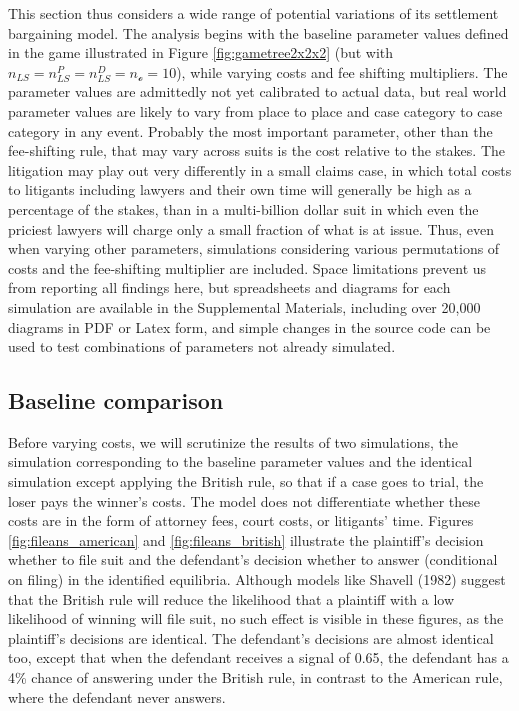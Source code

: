 \documentclass{article}
\begin{document}
This section thus considers a wide range of potential variations of its settlement bargaining model. The analysis begins with the baseline parameter values defined in the game illustrated in Figure \ref{fig:gametree2x2x2} (but with $n_{LS}=n_{LS}^P=n_{LS}^D=n_{\mathcal{o}}=10$), while varying costs and fee shifting multipliers. The parameter values are admittedly not yet calibrated to actual data, but real world parameter values are likely to vary from place to place and case category to case category in any event. Probably the most important parameter, other than the fee-shifting rule, that may vary across suits is the cost relative to the stakes. The litigation may play out very differently in a small claims case, in which total costs to litigants including lawyers and their own time will generally be high as a percentage of the stakes, than in a multi-billion dollar suit in which even the priciest lawyers will charge only a small fraction of what is at issue. Thus, even when varying other parameters, simulations considering various permutations of costs and the fee-shifting multiplier are included. Space limitations prevent us from reporting all findings here, but spreadsheets and diagrams for each simulation are available in the Supplemental Materials, including over 20,000 diagrams in PDF or Latex form, and simple changes in the source code can be used to test combinations of parameters not already simulated.

\subsection{Baseline comparison} \label{baseline}

Before varying costs, we will scrutinize the results of two simulations, the simulation corresponding to the baseline parameter values and the identical simulation except applying the British rule, so that if a case goes to trial, the loser pays the winner's costs. The model does not differentiate whether these costs are in the form of attorney fees, court costs, or litigants' time. Figures \ref{fig:fileans_american} and \ref{fig:fileans_british} illustrate the plaintiff's decision whether to file suit and the defendant's decision whether to answer (conditional on filing) in the identified equilibria. Although models like Shavell (1982) \cite{shavell} suggest that the British rule will reduce the likelihood that a plaintiff with a low likelihood of winning will file suit, no such effect is visible in these figures, as the plaintiff's decisions are identical. The defendant's decisions are almost identical too, except that when the defendant receives a signal of 0.65, the defendant has a 4\% chance of answering under the British rule, in contrast to the American rule, where the defendant never answers. 
\end{document}

